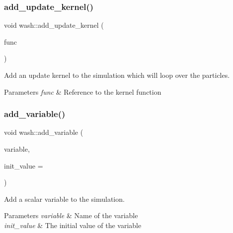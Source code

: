\subsubsection{\texorpdfstring{add\+\_\+update\+\_\+kernel()}{add\_update\_kernel()}}
{\footnotesize\ttfamily void wash\+::add\+\_\+update\+\_\+kernel (\begin{DoxyParamCaption}\item[{const \mbox{\hyperlink{namespacewash_aaae2f0d4980b7c550d6de709b35f0b8e}{Update\+FuncT}}}]{func }\end{DoxyParamCaption})}



Add an update kernel to the simulation which will loop over the particles. 


\begin{DoxyParams}{Parameters}
{\em func} & Reference to the kernel function \\
\hline
\end{DoxyParams}
\mbox{\label{namespacewash_ae40d87ba5e1d4b16f1cc52932a030b3d}} 
\subsubsection{\texorpdfstring{add\+\_\+variable()}{add\_variable()}}
{\footnotesize\ttfamily void wash\+::add\+\_\+variable (\begin{DoxyParamCaption}\item[{const std\+::string}]{variable,  }\item[{double}]{init\+\_\+value = {} }\end{DoxyParamCaption})}



Add a scalar variable to the simulation. 


\begin{DoxyParams}{Parameters}
{\em variable} & Name of the variable \\
\hline
{\em init\+\_\+value} & The initial value of the variable \\
\hline
\end{DoxyParams}
\mbox{\label{namespacewash_ab49fcc701f7afced2186465ba5cce978}} 
